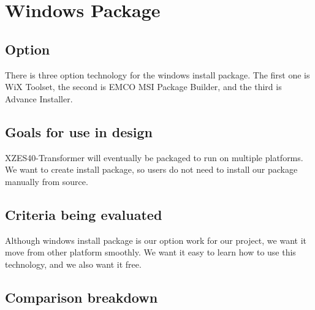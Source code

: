 \section{Windows Package}

\subsection{Option}

There is three option technology for the windows install package.
The first one is WiX Toolset, the second is EMCO MSI Package Builder, and the third is Advance Installer.

\subsection{Goals for use in design}

XZES40-Transformer will eventually be packaged to run on multiple platforms.
We want to create install package, so users do not need to install our package manually from source.

\subsection{Criteria being evaluated}

Although windows install package is our option work for our project, we want it move from other platform smoothly.
We want it easy to learn how to use this technology, and we also want it free.

\subsection{Comparison breakdown}

